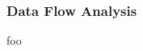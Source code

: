 
\subsubsection{Data Flow Analysis}
\label{sec:lit_review_data_flow_analysis}

foo

\cite{type_based_decomp}
